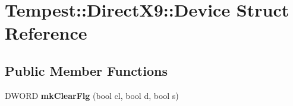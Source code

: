 \hypertarget{struct_direct_x9_1_1_device}{\section{Tempest\+:\+:Direct\+X9\+:\+:Device Struct Reference}
\label{struct_direct_x9_1_1_device}
}
\subsection*{Public Member Functions}
\begin{DoxyCompactItemize}
\item 
\hypertarget{struct_direct_x9_1_1_device_a3fd58c92a22dda95d409370c62b94f31}{D\+W\+O\+R\+D {\bfseries mk\+Clear\+Flg} (bool cl, bool d, bool s)}\label{struct_direct_x9_1_1_device_a3fd58c92a22dda95d409370c62b94f31}

\end{DoxyCompactItemize}
